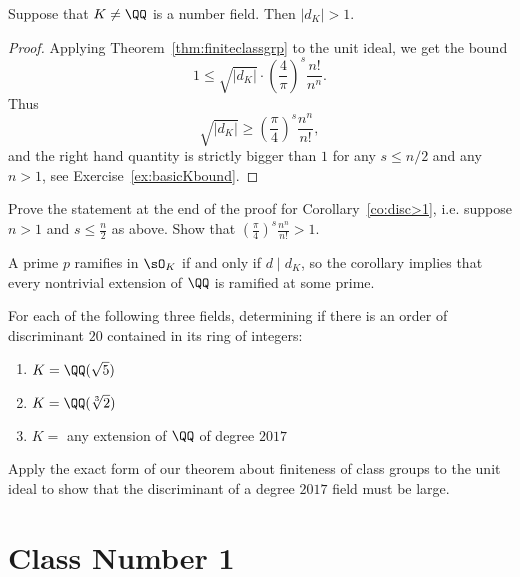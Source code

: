 \begin{corollary}\label{co:disc>1}
	Suppose that $K\neq \QQ$ is a number field.  Then $|d_K|>1$.
\end{corollary}
\begin{proof}
	Applying Theorem~\ref{thm:finiteclassgrp} to the unit ideal,
	we get the bound
	$$
	1\leq \sqrt{|d_K|}\cdot \left(\frac{4}{\pi}\right)^s\frac{n!}{n^n}.
	$$
	Thus
	$$
	\sqrt{|d_K|}
	\geq
	\left(\frac{\pi}{4}\right)^s\frac{n^n}{n!},
	$$
	and the right hand quantity is strictly bigger than $1$ for
	any $s\leq n/2$ and any $n>1$, see Exercise~\ref{ex:basicKbound}.
\end{proof}

\begin{exercise}\label{ex:basicKbound}
	Prove the statement at the end of the proof for Corollary~\ref{co:disc>1},
	i.e. suppose $n>1$ and $s\leq \frac{n}{2}$ as above. Show that
	$\left(\frac{\pi}{4}\right)^s\frac{n^n}{n!} > 1.$
\end{exercise}

A prime $p$ ramifies in $\sO_K$ if and only if $d\mid d_K$,
so the corollary implies that every nontrivial extension of $\QQ$
is ramified at some prime.

\begin{exercise}
	For each of the following three fields, determining if there is
	an order of discriminant $20$ contained in its ring of integers:
	\begin{enumerate}
		\item $K = \QQ(\sqrt{5})$
		\item $K = \QQ(\sqrt[3]{2})$
		\item $K = $ any extension of $\QQ$ of degree $2017$
	\end{enumerate}
	
	\begin{hint}
		Apply the exact form of our theorem about finiteness of class groups
		to the unit ideal to show that the discriminant of a degree $2017$
		field must be large.
	\end{hint}
\end{exercise}

\section{Class Number 1}\label{sec:cn1}

